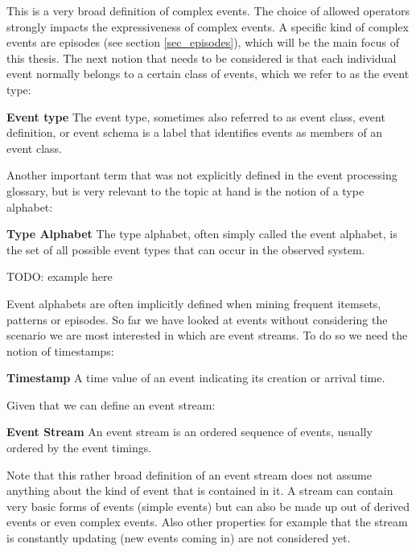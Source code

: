 This is a very broad definition of complex events. The choice of allowed operators strongly impacts the expressiveness of complex events. A specific kind of complex events are episodes (see section \ref{sec_episodes}), which will be the main focus of this thesis.
The next notion that needs to be considered is that each individual event normally belongs to a certain class of events, which we refer to as the event type:

\begin{mydef}
\textbf{Event type} The event type, sometimes also referred to as event class, event definition, or event schema is a label that identifies events as members of an event class.
\end{mydef}

Another important term that was not explicitly defined in the event processing glossary, but is very relevant to the topic at hand is the notion of a type alphabet:

\begin{mydef}
\textbf{Type Alphabet} The type alphabet, often simply called the event alphabet, is the set of all possible event types that can occur in the observed system.
\end{mydef}

TODO: example here

Event alphabets are often implicitly defined when mining frequent itemsets, patterns or episodes.
So far we have looked at events without considering the scenario we are most interested in which are event streams. To do so we need the notion of timestamps:

\begin{mydef}
\textbf{Timestamp} A time value of an event indicating its creation or arrival time.
\end{mydef}

Given that we can define an event stream:

\begin{mydef}
\textbf{Event Stream} An event stream is an ordered sequence of events, usually ordered by the event timings.
\end{mydef}

Note that this rather broad definition of an event stream does not assume anything about the kind of event that is contained in it. A stream can contain very basic forms of events (simple events) but can also be made up out of derived events or even complex events. Also other properties for example that the stream is constantly updating (new events coming in) are not considered yet.


